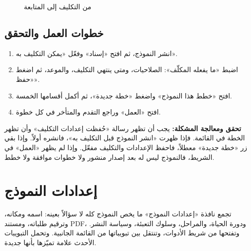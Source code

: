 \begin{figure}[H]
\centering
{}
\rclegend
\caption{من التكليف إلى المتابعة}
\label{fig:builder-forms-assign-work-flow}
\end{figure}

\subsection{خطوات العمل والتحقق}
\begin{enumerate}
\item انشر النموذج، ثم افتح «إسناد» وفعّل «يمكن التكليف به».
\item اضبط «ما يفعله المكلّف»: الصلاحيات، ومتى ينتهي التكليف، والموعد، ثم اضغط «حفظ».
\item افتح «خطط هذا النموذج» واضغط «خطة جديدة»، ثم أكمل أقسامها الخمسة.
\item افتح «العمل» وراجع التقدم والمتأخر في كل خطوة.
\end{enumerate}

\textbf{تحقق ومعالجة المشكلة:} يجب أن تظهر رسالة «حُفظت إعدادات التكليف» وأن تظهر الخطة في القائمة. فإذا ظهرت «انشر النموذج قبل التكليف به»، فانشره أولاً. وإذا بقي زر «خطة جديدة» معطلاً، فاحفظ الإعدادات والتكليف مفعّل. وإذا لم يظهر «العمل» في الشريط، فالنموذج ليس له بعد إصدار منشور ولا خطوات موافقة ولا خطط.

\clearpage
\section{إعدادات النموذج}
\label{sec:builder-feature-forms-settings}

تجمع نافذة «إعدادات النموذج» ما يخص النموذج كله لا سؤالاً بعينه: اسمه ومكانه، وترقيم طلباته، ومستند PDF، ودورة الحياة، والمراحل، وسلوك التعبئة، وسياسة النشر. وتفتحها من شريط الأدوات، وتنتقل بين تبويباتها من القائمة الجانبية. وتحمل التبويبات الأحدث علامة تميّزها بأنها جديدة.

